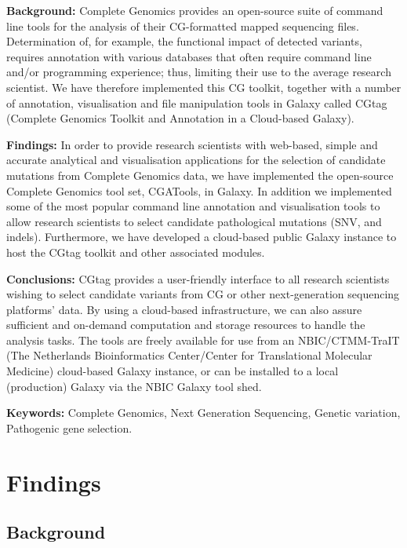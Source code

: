 \textbf{Background:} Complete Genomics provides an open-source suite of command line tools for the analysis of their CG-formatted mapped sequencing files. Determination of, for example, the functional impact of detected variants, requires annotation with various databases that often require command line and/or programming experience; thus, limiting their use to the average research scientist. We have therefore implemented this CG toolkit, together with a number of annotation, visualisation and file manipulation tools in Galaxy called CGtag (Complete Genomics Toolkit and Annotation in a Cloud-based Galaxy).


\textbf{Findings:} In order to provide research scientists with web-based, simple and accurate analytical and visualisation applications for the selection of candidate mutations from Complete Genomics data, we have implemented the open-source Complete Genomics tool set, CGATools, in Galaxy. In addition we implemented some of the most popular command line annotation and visualisation tools to allow research scientists to select candidate pathological mutations (SNV, and indels). Furthermore, we have developed a cloud-based public Galaxy instance to host the CGtag toolkit and other associated modules.

\textbf{Conclusions:} CGtag provides a user-friendly interface to all research scientists wishing to select candidate variants from CG or other next-generation sequencing platforms’ data. By using a cloud-based infrastructure, we can also assure sufficient and on-demand computation and storage resources to handle the analysis tasks. The tools are freely available for use from an NBIC/CTMM-TraIT (The Netherlands Bioinformatics Center/Center for Translational Molecular Medicine) cloud-based Galaxy instance, or can be installed to a local (production) Galaxy via the NBIC Galaxy tool shed.

\textbf{Keywords:} Complete Genomics, Next Generation Sequencing, Genetic variation, Pathogenic gene selection.



\section*{Findings }

\subsection*{Background}

